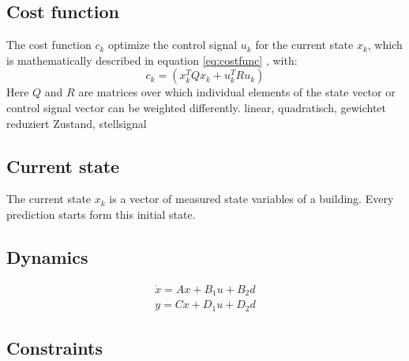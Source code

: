 \subsection{Cost function}
\label{subsection:costfunction}
The cost function $c_k$ optimize the control signal $u_k$ for the current state $x_k$, which is mathematically described in equation
\ref{eq:costfunc}
, with:
\begin{equation}
\label{eq:c_k}
c_k = (x_k^TQx_k+u_k^TRu_k)
\end{equation}
Here $Q$ and $R$ are matrices over which individual elements of the state vector or control signal vector can be weighted differently.  
\cite{Kouvaritakis.2016}
linear, quadratisch, gewichtet 
reduziert Zustand, stellsignal
\subsection{Current state}
\label{subsection:currentstate}
The current state $x_k$ is a vector of measured state variables of a building. Every prediction starts form this initial state\cite{Oldewurtel.2012}.
\subsection{Dynamics}
\label{subsection:dynamics}
\begin{align}
\label{eq:statespace}
\dot{x}=Ax+B_1u+B_2d\\
y=Cx+D_1u+D_2d
\end{align}


\subsection{Constraints}
\label{subsection:constraints}




%
%



